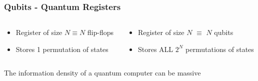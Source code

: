 \documentclass[aspectratio=169]{beamer}
\begin{document}
\begin{frame}
    \frametitle{Qubits - Quantum Registers}
    \begin{columns}
        \begin{column}{0.5\textwidth}
            \begin{itemize}
                \item Register of size $N \equiv N$ flip-flops
                \item Stores 1 permutation of states
            \end{itemize}
        \end{column}
        \begin{column}{0.5\textwidth}
            \begin{itemize}
                \item Register of size $N$ $\equiv$ $N$ qubits
                \item Stores ALL $2^N$ permutations of states
            \end{itemize}
        \end{column}
    \end{columns}
    \begin{block}{}
        \centering The information density of a quantum computer can be massive
    \end{block}
\end{frame}
\end{document}
